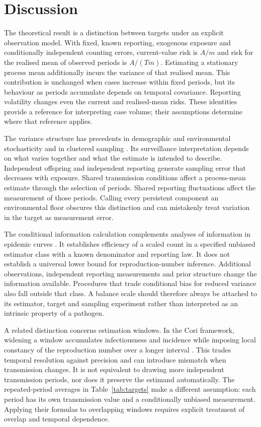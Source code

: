 \section{Discussion}
\label{sec:discussion}

The theoretical result is a distinction between targets under an explicit observation model. With fixed, known reporting, exogenous exposure and conditionally independent counting errors, current-value risk is $A/m$ and risk for the realised mean of observed periods is $A/(Tm)$. Estimating a stationary process mean additionally incurs the variance of that realised mean. This contribution is unchanged when cases increase within fixed periods, but its behaviour as periods accumulate depends on temporal covariance. Reporting volatility changes even the current and realised-mean risks. These identities provide a reference for interpreting case volume; their assumptions determine where that reference applies.

The variance structure has precedents in demographic and environmental stochasticity and in clustered sampling \citep{engen1998demographic, cochran1977sampling}. Its surveillance interpretation depends on what varies together and what the estimate is intended to describe. Independent offspring and independent reporting generate sampling error that decreases with exposure. Shared transmission conditions affect a process-mean estimate through the selection of periods. Shared reporting fluctuations affect the measurement of those periods. Calling every persistent component an environmental floor obscures this distinction and can mistakenly treat variation in the target as measurement error.

The conditional information calculation complements analyses of information in epidemic curves \citep{parag2022quantifying, parag2022fundamental}. It establishes efficiency of a scaled count in a specified unbiased estimator class with a known denominator and reporting law. It does not establish a universal lower bound for reproduction-number inference. Additional observations, independent reporting measurements and prior structure change the information available. Procedures that trade conditional bias for reduced variance also fall outside that class. A balance scale should therefore always be attached to its estimator, target and sampling experiment rather than interpreted as an intrinsic property of a pathogen.

A related distinction concerns estimation windows. In the Cori framework, widening a window accumulates infectiousness and incidence while imposing local constancy of the reproduction number over a longer interval \citep{cori2013new, gostic2020practical}. This trades temporal resolution against precision and can introduce mismatch when transmission changes. It is not equivalent to drawing more independent transmission periods, nor does it preserve the estimand automatically. The repeated-period averages in Table~\ref{tab:targets} make a different assumption: each period has its own transmission value and a conditionally unbiased measurement. Applying their formulas to overlapping windows requires explicit treatment of overlap and temporal dependence.

